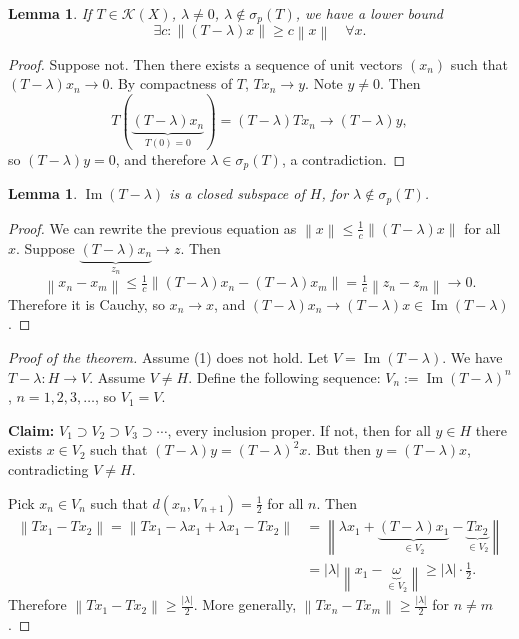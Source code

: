 \documentclass[12pt]{article}
\renewcommand{\Im}{\operatorname{Im}}
\newcommand{\abs}[1]{\left| #1 \right|}
\newcommand{\norm}[1]{\left\| #1 \right\|}
\newcommand{\cK}{\mathcal{K}}
\newtheorem{lma}[thm]{Lemma}
\theoremstyle{definition}
\begin{document}
\begin{lma}
	If $T \in \cK(X)$, $\lambda \neq 0$, $\lambda \notin \sigma_p(T)$, we have a lower bound
	\begin{equation*}
		\exists c : \norm{(T-\lambda)x} \geq c\norm{x} \quad \forall x.
	\end{equation*}
\end{lma}
\begin{proof}
	Suppose not.
	Then there exists a sequence of unit vectors $(x_n)$ such that $(T-\lambda)x_n \to 0$.
	By compactness of $T$, $Tx_n \to y$.
	Note $y \neq 0$.
	Then
	\begin{equation*}
		T(\underbrace{(T-\lambda)x_n}_{T(0) = 0}) = (T-\lambda)Tx_n \to (T-\lambda)y,
	\end{equation*}
	so $(T-\lambda)y = 0$, and therefore $\lambda \in \sigma_p(T)$, a contradiction.
\end{proof}

\begin{lma}
	$\Im(T-\lambda)$ is a closed subspace of $H$, for $\lambda \notin \sigma_p(T)$.
\end{lma}
\begin{proof}
	We can rewrite the previous equation as $\norm{x} \leq \frac{1}{c} \norm{(T-\lambda)x}$ for all $x$.
	Suppose $\underbrace{(T-\lambda)x_n}_{z_n} \to z$.
	Then
	\begin{equation*}
		\norm{x_n - x_m} \leq \tfrac{1}{c} \norm{(T-\lambda)x_n - (T-\lambda)x_m} = \tfrac{1}{c} \norm{z_n - z_m} \to 0.
	\end{equation*}
	Therefore it is Cauchy, so $x_n \to x$, and $(T-\lambda)x_n \to (T-\lambda)x \in \Im(T-\lambda)$.
\end{proof}

\begin{proof}[Proof of the theorem]
	Assume (1) does not hold.
	Let $V = \Im(T-\lambda)$.
	We have $T - \lambda : H \to V$.
	Assume $V \neq H$.
	Define the following sequence: $V_n := \Im(T-\lambda)^n$, $n = 1, 2, 3, \dots$, so $V_1 = V$.

	\textbf{Claim: } $V_1 \supset V_2 \supset V_3 \supset \cdots$, every inclusion proper.
	If not, then for all $y \in H$ there exists $x \in V_2$ such that $(T-\lambda)y = (T-\lambda)^2x$.
	But then $y = (T-\lambda)x$, contradicting $V \neq H$.

	Pick $x_n \in V_n$ such that $d(x_n, V_{n+1}) = \frac{1}{2}$ for all $n$.
	Then
	\begin{align*}
		\norm{Tx_1 - Tx_2} = \norm{Tx_1 - \lambda x_1 + \lambda x_1 - Tx_2} &= \norm{\lambda x_1 + \underbrace{(T-\lambda)x_1}_{\in V_2} - \underbrace{Tx_2}_{\in V_2}} \\
		&= \abs{\lambda} \norm{x_1 - \underbrace{\omega}_{\in V_2}} \geq \abs{\lambda} \cdot \tfrac{1}{2}.
	\end{align*}
	Therefore $\norm{Tx_1 - Tx_2} \geq \frac{\abs{\lambda}}{2}$.
	More generally, $\norm{Tx_n - Tx_m} \geq \frac{\abs{\lambda}}{2}$ for $n \neq m$.
\end{proof}
\end{document}
